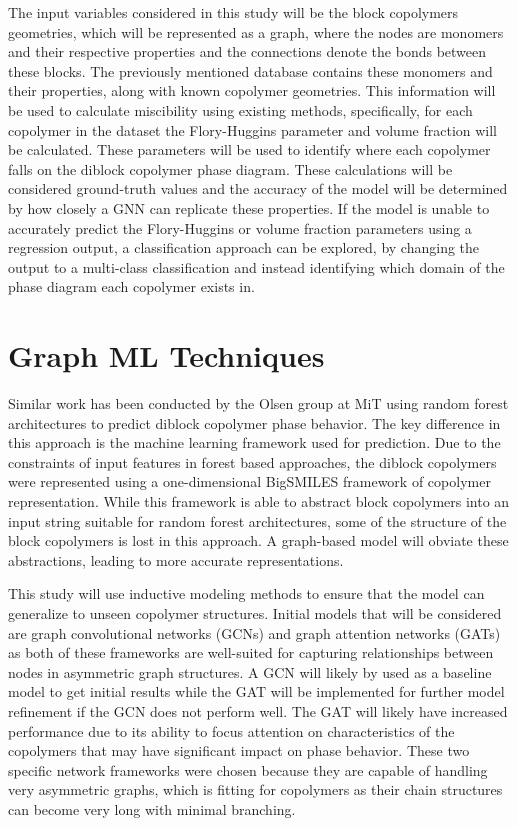 \documentclass{article}
\begin{document}
The input variables considered in this study will be the block copolymers geometries, which will be represented as a graph, where the nodes are monomers and their respective properties and the connections denote the bonds between these blocks. The previously mentioned database contains these monomers and their properties, along with known copolymer geometries. This information will be used to calculate miscibility using existing methods, specifically, for each copolymer in the dataset the Flory-Huggins parameter and volume fraction will be calculated. These parameters will be used to identify where each copolymer falls on the diblock copolymer phase diagram. These calculations will be considered ground-truth values and the accuracy of the model will be determined by how closely a GNN can replicate these properties. If the model is unable to accurately predict the Flory-Huggins or volume fraction parameters using a regression output, a classification approach can be explored, by changing the output to a multi-class classification and instead identifying which domain of the phase diagram each copolymer exists in.

\section{Graph ML Techniques}

Similar work has been conducted by the Olsen group at MiT\cite{RandForest} using random forest architectures to predict diblock copolymer phase behavior. The key difference in this approach is the machine learning framework used for prediction. Due to the constraints of input features in forest based approaches, the diblock copolymers were represented using a one-dimensional BigSMILES\cite{BigSMILES} framework of copolymer representation. While this framework is able to abstract block copolymers into an input string suitable for random forest architectures, some of the structure of the block copolymers is lost in this approach. A graph-based model will obviate these abstractions, leading to more accurate representations.

This study will use inductive modeling methods to ensure that the model can generalize to unseen copolymer structures. Initial models that will be considered are graph convolutional networks (GCNs) and graph attention networks (GATs) as both of these frameworks are well-suited for capturing relationships between nodes in asymmetric graph structures. A GCN will likely by used as a baseline model to get initial results while the GAT will be implemented for further model refinement if the GCN does not perform well. The GAT will likely have increased performance due to its ability to focus attention on characteristics of the copolymers that may have significant impact on phase behavior. These two specific network frameworks were chosen because they are capable of handling very asymmetric graphs, which is fitting for copolymers as their chain structures can become very long with minimal branching.
\end{document}
